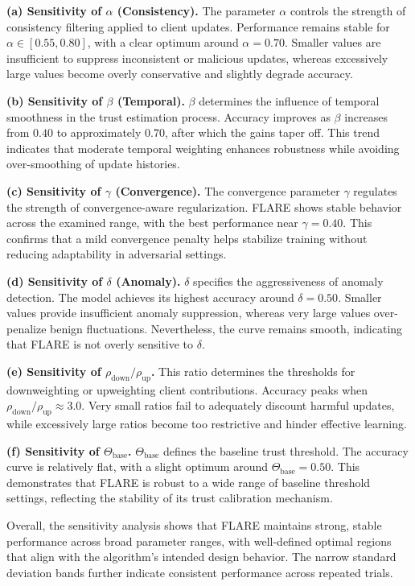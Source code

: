 \documentclass[lettersize,journal]{IEEEtran}
\begin{document}
\textbf{(a) Sensitivity of $\alpha$ (Consistency).}
The parameter $\alpha$ controls the strength of consistency filtering applied to client updates. Performance remains stable for $\alpha \in [0.55, 0.80]$, with a clear optimum around $\alpha = 0.70$. Smaller values are insufficient to suppress inconsistent or malicious updates, whereas excessively large values become overly conservative and slightly degrade accuracy.

\textbf{(b) Sensitivity of $\beta$ (Temporal).}
$\beta$ determines the influence of temporal smoothness in the trust estimation process. Accuracy improves as $\beta$ increases from $0.40$ to approximately $0.70$, after which the gains taper off. This trend indicates that moderate temporal weighting enhances robustness while avoiding over-smoothing of update histories.

\textbf{(c) Sensitivity of $\gamma$ (Convergence).}
The convergence parameter $\gamma$ regulates the strength of convergence-aware regularization. \textsc{FLARE} shows stable behavior across the examined range, with the best performance near $\gamma = 0.40$. This confirms that a mild convergence penalty helps stabilize training without reducing adaptability in adversarial settings.

\textbf{(d) Sensitivity of $\delta$ (Anomaly).}
$\delta$ specifies the aggressiveness of anomaly detection. The model achieves its highest accuracy around $\delta = 0.50$. Smaller values provide insufficient anomaly suppression, whereas very large values over-penalize benign fluctuations. Nevertheless, the curve remains smooth, indicating that \textsc{FLARE} is not overly sensitive to $\delta$.

\textbf{(e) Sensitivity of $\rho_{\text{down}}/\rho_{\text{up}}$.}
This ratio determines the thresholds for downweighting or upweighting client contributions. Accuracy peaks when $\rho_{\text{down}}/\rho_{\text{up}} \approx 3.0$. Very small ratios fail to adequately discount harmful updates, while excessively large ratios become too restrictive and hinder effective learning.

\textbf{(f) Sensitivity of $\Theta_{\text{base}}$.}
$\Theta_{\text{base}}$ defines the baseline trust threshold. The accuracy curve is relatively flat, with a slight optimum around $\Theta_{\text{base}} = 0.50$. This demonstrates that \textsc{FLARE} is robust to a wide range of baseline threshold settings, reflecting the stability of its trust calibration mechanism.

\smallskip
\noindent
Overall, the sensitivity analysis shows that \textsc{FLARE} maintains strong, stable performance across broad parameter ranges, with well-defined optimal regions that align with the algorithm's intended design behavior. The narrow standard deviation bands further indicate consistent performance across repeated trials.
\end{document}
